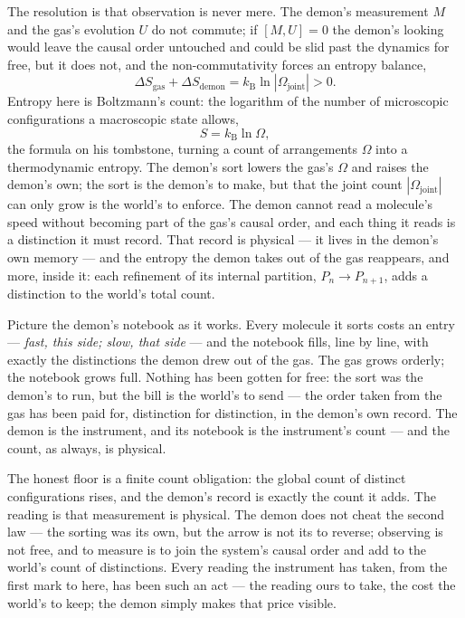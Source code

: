 The resolution is that observation is never mere. The demon's measurement $M$ and the gas's evolution $U$ do
not commute; if $[M, U] = 0$ the demon's looking would leave the causal order untouched and could be slid past
the dynamics for free, but it does not, and the non-commutativity forces an entropy balance,
\begin{equation}
  \Delta S_{\text{gas}} + \Delta S_{\text{demon}} = k_{\mathrm{B}}\ln\!\left|\Omega_{\text{joint}}\right| > 0 .
\end{equation}
Entropy here is Boltzmann's count: the logarithm of the number of microscopic configurations a macroscopic
state allows,
\begin{equation}
  S = k_{\mathrm{B}} \ln \Omega,
\end{equation}
the formula on his tombstone, turning a count of arrangements $\Omega$ into a thermodynamic entropy. The
demon's sort lowers the gas's $\Omega$ and raises the demon's own; the sort is the demon's to make, but
that the joint count $|\Omega_{\text{joint}}|$ can only grow is the world's to enforce. The demon cannot read a molecule's speed without becoming part of the
gas's causal order, and each thing it
reads is a distinction it must record. That record is physical --- it lives in the demon's own memory --- and
the entropy the demon takes out of the gas reappears, and more, inside it: each refinement of its internal
partition, $P_n \to P_{n+1}$, adds a distinction to the world's total count.

Picture the demon's notebook as it works. Every molecule it sorts costs an entry --- \emph{fast, this side;
slow, that side} --- and the notebook fills, line by line, with exactly the distinctions the demon drew out of
the gas. The gas grows orderly; the notebook grows full. Nothing has been gotten for free: the sort was the demon's to run, but the bill is the world's to send ---
the order taken from the gas has been paid for, distinction for distinction, in the demon's own record. The demon is the
instrument, and its notebook is the instrument's count --- and the count, as always, is physical.

The honest floor is a finite count obligation: the global count of distinct configurations rises, and the
demon's record is exactly the count it adds. The reading is that measurement is physical. The
demon does not cheat the second law --- the sorting was its own, but the arrow is not its to reverse; observing
is not free, and to measure is to join the system's causal order and add to the world's count of distinctions.
Every reading the instrument has taken, from the first mark to here, has been such an act --- the reading ours
to take, the cost the world's to keep; the demon simply makes that price visible.

